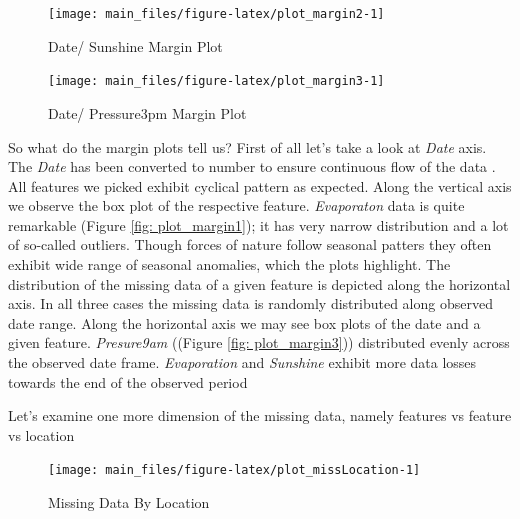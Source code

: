 \begin{Schunk}
\begin{figure}[H]

{\centering \texttt{[image: main\_files/figure-latex/plot\_margin2-1]} 

}

\caption[Date/ Sunshine Margin Plot]{Date/ Sunshine Margin Plot}\label{fig:plot_margin2}
\end{figure}
\end{Schunk}

\begin{Schunk}
\begin{figure}[H]

{\centering \texttt{[image: main\_files/figure-latex/plot\_margin3-1]} 

}

\caption[Date/ Pressure3pm Margin Plot]{Date/ Pressure3pm Margin Plot}\label{fig:plot_margin3}
\end{figure}
\end{Schunk}

So what do the margin plots tell us? First of all let's take a look at
\emph{Date} axis. The \emph{Date} has been converted to number to ensure
continuous flow of the data . All features we picked exhibit cyclical
pattern as expected. Along the vertical axis we observe the box plot of
the respective feature. \emph{Evaporaton} data is quite remarkable
(Figure \ref{fig: plot_margin1}); it has very narrow distribution and a
lot of so-called outliers. Though forces of nature follow seasonal
patters they often exhibit wide range of seasonal anomalies, which the
plots highlight. The distribution of the missing data of a given feature
is depicted along the horizontal axis. In all three cases the missing
data is randomly distributed along observed date range. Along the
horizontal axis we may see box plots of the date and a given feature.
\emph{Presure9am} ((Figure \ref{fig: plot_margin3})) distributed evenly
across the observed date frame. \emph{Evaporation} and \emph{Sunshine}
exhibit more data losses towards the end of the observed period

Let's examine one more dimension of the missing data, namely features vs
feature vs location

\begin{Schunk}
\begin{figure}[H]

{\centering \texttt{[image: main\_files/figure-latex/plot\_missLocation-1]} 

}

\caption[Missing Data By Location]{Missing Data By Location}\label{fig:plot_missLocation}
\end{figure}
\end{Schunk}

